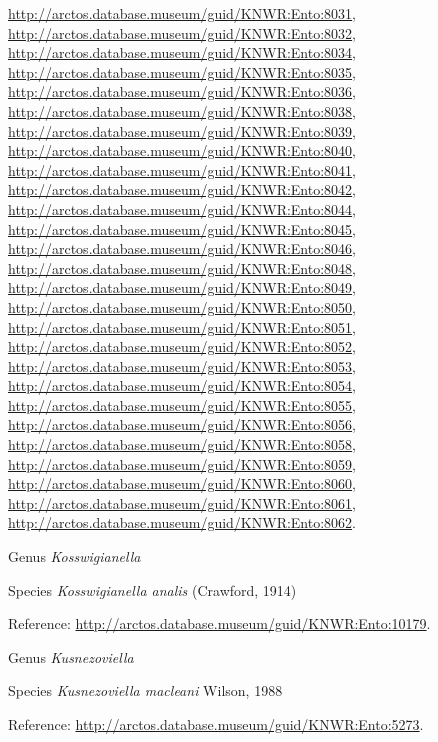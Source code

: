 \documentclass[9pt, article]{memoir}
\begin{document}
\begin{multicols}{2}
\url{http://arctos.database.museum/guid/KNWR:Ento:8031}, 
\url{http://arctos.database.museum/guid/KNWR:Ento:8032}, 
\url{http://arctos.database.museum/guid/KNWR:Ento:8034}, 
\url{http://arctos.database.museum/guid/KNWR:Ento:8035}, 
\url{http://arctos.database.museum/guid/KNWR:Ento:8036}, 
\url{http://arctos.database.museum/guid/KNWR:Ento:8038}, 
\url{http://arctos.database.museum/guid/KNWR:Ento:8039}, 
\url{http://arctos.database.museum/guid/KNWR:Ento:8040}, 
\url{http://arctos.database.museum/guid/KNWR:Ento:8041}, 
\url{http://arctos.database.museum/guid/KNWR:Ento:8042}, 
\url{http://arctos.database.museum/guid/KNWR:Ento:8044}, 
\url{http://arctos.database.museum/guid/KNWR:Ento:8045}, 
\url{http://arctos.database.museum/guid/KNWR:Ento:8046}, 
\url{http://arctos.database.museum/guid/KNWR:Ento:8048}, 
\url{http://arctos.database.museum/guid/KNWR:Ento:8049}, 
\url{http://arctos.database.museum/guid/KNWR:Ento:8050}, 
\url{http://arctos.database.museum/guid/KNWR:Ento:8051}, 
\url{http://arctos.database.museum/guid/KNWR:Ento:8052}, 
\url{http://arctos.database.museum/guid/KNWR:Ento:8053}, 
\url{http://arctos.database.museum/guid/KNWR:Ento:8054}, 
\url{http://arctos.database.museum/guid/KNWR:Ento:8055}, 
\url{http://arctos.database.museum/guid/KNWR:Ento:8056}, 
\url{http://arctos.database.museum/guid/KNWR:Ento:8058}, 
\url{http://arctos.database.museum/guid/KNWR:Ento:8059}, 
\url{http://arctos.database.museum/guid/KNWR:Ento:8060}, 
\url{http://arctos.database.museum/guid/KNWR:Ento:8061}, 
\url{http://arctos.database.museum/guid/KNWR:Ento:8062}.

\vspace{6pt}\noindent\hspace{30pt}Genus \textit{Kosswigianella}


\vspace{6pt}\noindent\hspace{36pt}Species \textit{Kosswigianella analis} (Crawford, 1914)


Reference: 
\url{http://arctos.database.museum/guid/KNWR:Ento:10179}.

\vspace{6pt}\noindent\hspace{30pt}Genus \textit{Kusnezoviella}


\vspace{6pt}\noindent\hspace{36pt}Species \textit{Kusnezoviella macleani} Wilson, 1988


Reference: 
\url{http://arctos.database.museum/guid/KNWR:Ento:5273}.


\end{multicols}
\end{document}
